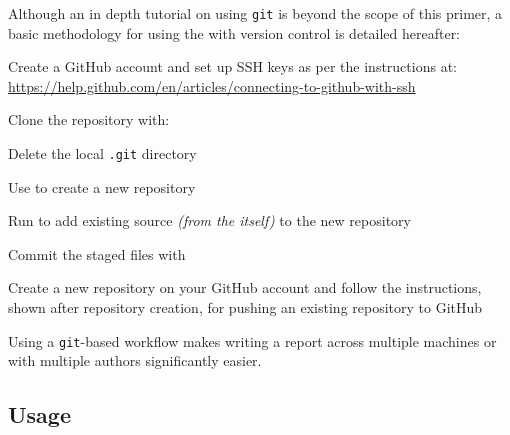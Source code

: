 Although an in depth tutorial on using \texttt{git} is beyond the scope of this primer, a basic methodology for using the \uswdwmspkg{} with version control is detailed hereafter:

\begin{methodology0}
  \item Create a GitHub account and set up SSH keys as per the instructions at:\\
    \href{https://help.github.com/en/articles/connecting-to-github-with-ssh}{https://help.github.com/en/articles/connecting-to-github-with-ssh}
  \item Clone the \uswdwmspkg{} repository with:\\
  \item Delete the local \texttt{.git} directory
  \item Use  to create a new repository
  \item Run  to add existing source \textit{(from the \uswdwmspkg{} itself)} to the new repository
  \item Commit the staged files with 
  \item Create a new repository on your GitHub account and follow the instructions, shown after repository creation, for pushing an existing repository to GitHub
\end{methodology0}

\noindent Using a \texttt{git}-based workflow makes writing a report across multiple machines or with multiple authors significantly easier.

\pagebreak
\subsection{Usage}
